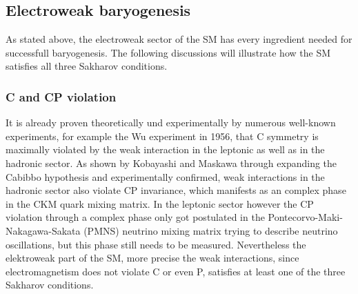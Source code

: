 \subsection{Electroweak baryogenesis}
As stated above, the electroweak sector of the SM has every ingredient needed for successfull baryogenesis. The following discussions will illustrate how the SM satisfies all three Sakharov conditions.
\subsubsection{C and CP violation}
It is already proven theoretically und experimentally by numerous well-known experiments, for example the Wu experiment in 1956, that C symmetry is maximally violated by the weak interaction in the leptonic as well as in the hadronic sector. As shown by Kobayashi and Maskawa through expanding the Cabibbo hypothesis and experimentally confirmed, weak interactions in the hadronic sector also violate CP invariance, which manifests as an complex phase in the CKM quark mixing matrix. In the leptonic sector however the CP violation through a complex phase only got postulated in the Pontecorvo-Maki-Nakagawa-Sakata (PMNS) neutrino mixing matrix trying to describe neutrino oscillations, but this phase still needs to be measured.\newline\indent
Nevertheless the elektroweak part of the SM, more precise the weak interactions, since electromagnetism does not violate C or even P, satisfies at least one of the three Sakharov conditions.\newline\indent
